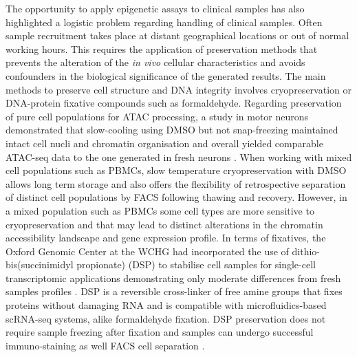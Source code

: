The opportunity to apply epigenetic assays to clinical samples has also highlighted a logistic problem regarding handling of clinical samples. Often sample recruitment takes place at distant geographical locations or out of normal working hours. This requires the application of preservation methods that prevents the alteration of the \textit{in vivo} cellular characteristics and avoids confounders in the biological significance of the generated results. The main methods to preserve cell structure and DNA integrity involves cryopreservation or DNA-protein fixative compounds such as formaldehyde. Regarding preservation of pure cell populations for ATAC processing, a study in motor neurons demonstrated that slow-cooling using DMSO but not snap-freezing maintained intact cell nucli and chromatin organisation and overall yielded comparable ATAC-seq data to the one generated in fresh neurons \parencite{Milani2016}. When working with mixed cell populations such as PBMCs, slow temperature cryopreservation with DMSO allows long term storage and also offers the flexibility of retrospective separation of distinct cell populations by FACS following thawing and recovery. However, in a mixed population such as PBMCs some cell types are more sensitive to cryopreservation and that may lead to distinct alterations in the chromatin accessibility landscape and gene expression profile. In terms of fixatives, the Oxford Genomic Center at the WCHG had incorporated the use of dithio-bis(succinimidyl propionate) (DSP) to stabilise cell samples for single-cell transcriptomic applications demonstrating only moderate differences from fresh samples profiles \parencite{Attar2018}. DSP is a reversible cross-linker of free amine groups that fixes proteins without damaging RNA and is compatible with microfluidics-based scRNA-seq systems, alike formaldehyde fixation. DSP preservation does not require sample freezing after fixation and samples can undergo successful immuno-staining as well FACS cell separation \parencite{Espina2013}. %




